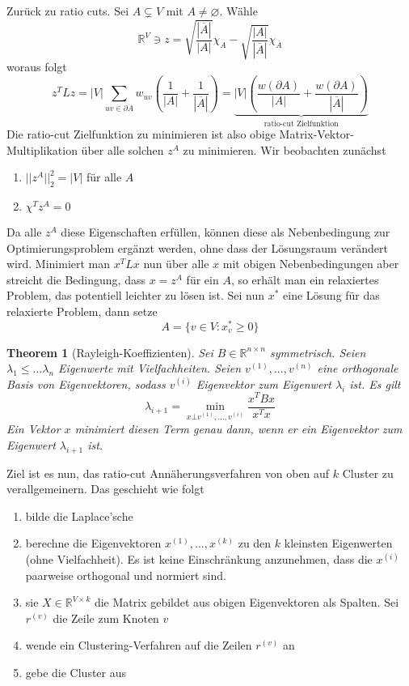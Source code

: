 \documentclass[a4paper, 12pt]{article}
\theoremstyle{plain}
\newtheorem{theorem}{Theorem}[subsection] %
\theoremstyle{definition}
\theoremstyle{lemma}
\theoremstyle{remark}
\theoremstyle{corollary}
\theoremstyle{example}
\begin{document}
	Zurück zu ratio cuts. Sei $A \subsetneq V$ mit $A\neq \varnothing$. Wähle \[\mathbb{R}^V \ni z = \sqrt{\frac{\left|\overline{A}\right|}{\left|A\right|}} \chi_A - \sqrt{\frac{\left|A\right|}{\left|\overline{A}\right|}}\chi_{\overline{A}}\] woraus folgt \[z^TLz = \left|V\right|\sum_{uv \in \partial A} w_{uv}(\frac{1}{\left|A\right|} + \frac{1}{\left|\overline{A}\right|}) = \underbrace{\left|V\right|\left(\frac{w(\partial A)}{\left|A\right|} + \frac{w(\partial A)}{\left|\overline{A}\right|}\right)}_{\text{ratio-cut Zielfunktion}}\] Die ratio-cut Zielfunktion zu minimieren ist also obige Matrix-Vektor-Multiplikation über alle solchen $z^A$ zu minimieren. Wir beobachten zunächst \begin{enumerate}
		\item $||z^A||_2^2 = \left|V\right|$ für alle $A$
		\item $\chi^Tz^A = 0$
	\end{enumerate}
	Da alle $z^A$ diese Eigenschaften erfüllen, können diese als Nebenbedingung zur Optimierungsproblem ergänzt werden, ohne dass der Lösungsraum verändert wird. Minimiert man $x^T L x$ nun über alle $x$ mit obigen Nebenbedingungen aber streicht die Bedingung, dass $x=z^A$ für ein $A$, so erhält man ein relaxiertes Problem, das potentiell leichter zu lösen ist. Sei nun $x^*$ eine Lösung für das relaxierte Problem, dann setze \[A = \{v \in V: x^*_v \geq 0\}\]
	\begin{theorem}[Rayleigh-Koeffizienten]
		Sei $B \in \mathbb{R}^{n\times n}$ symmetrisch. Seien $\lambda_1 \leq \dots \lambda_n$ Eigenwerte mit Vielfachheiten. Seien $v^{(1)},...,v^{(n)}$ eine orthogonale Basis von Eigenvektoren, sodass $v^{(i)}$ Eigenvektor zum Eigenwert $\lambda_i$ ist. Es gilt \[\lambda_{i+1} = \min_{x \bot v^{(1)},...,v^{(i)}} \frac{x^TBx}{x^Tx}\] Ein Vektor $x$ minimiert diesen Term genau dann, wenn er ein Eigenvektor zum Eigenwert $\lambda_{i+1}$ ist.
	\end{theorem}
	Ziel ist es nun, das ratio-cut Annäherungsverfahren von oben auf $k$ Cluster zu verallgemeinern. Das geschieht wie folgt \begin{enumerate}
		\item bilde die Laplace'sche
		\item berechne die Eigenvektoren $x^{(1)},...,x^{(k)}$ zu den $k$ kleinsten Eigenwerten (ohne Vielfachheit). Es ist keine Einschränkung anzunehmen, dass die $x^{(i)}$ paarweise orthogonal und normiert sind.
		\item sie $X \in \mathbb{R}^{V\times k}$ die Matrix gebildet aus obigen Eigenvektoren als Spalten. Sei $r^{(v)}$ die Zeile zum Knoten $v$
		\item wende ein Clustering-Verfahren auf die Zeilen $r^{(v)}$ an
		\item gebe die Cluster aus
	\end{enumerate}
\end{document}
